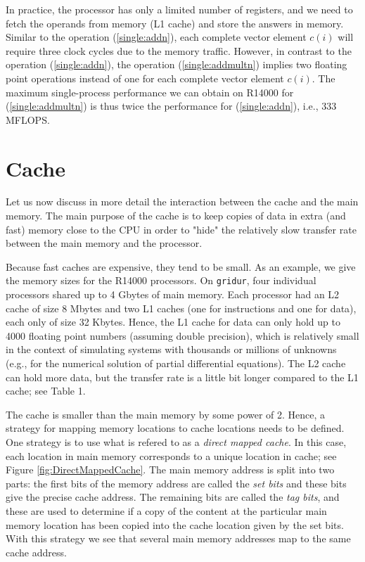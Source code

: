 \documentclass[11pt]{article}
\begin{document}
In practice, the processor has only a limited number of registers, 
and we need to fetch the operands from memory (L1 cache) 
and store the answers in memory.  
Similar to the operation (\ref{single:addn}), each complete 
vector element $c(i)$ will require three clock cycles due to the 
memory traffic. However, in contrast to the operation (\ref{single:addn}),
the operation (\ref{single:addmultn}) implies two floating point operations
instead of one for each complete vector element $c(i)$. 
The maximum single-process performance we can obtain 
on R14000 for (\ref{single:addmultn}) is thus 
twice the performance for (\ref{single:addn}), i.e., 333 MFLOPS. 

\section{Cache}

Let us now discuss in more detail the interaction between the 
cache and the main memory. The main purpose of the cache is to 
keep copies of data in extra (and fast) memory close to the CPU in order to "hide"
the relatively slow transfer rate between the main memory and the processor. 

Because fast caches are expensive, they tend to be small. 
As an example, we give the memory sizes for the R14000 processors. 
On \texttt{gridur}, four individual processors shared up to 4 Gbytes of main memory. 
Each processor had an L2 cache of size 8 Mbytes and two L1 caches 
(one for instructions and one for data), each only of size 32 Kbytes. 
Hence, the L1 cache for data can only hold up to 4000 floating point numbers
(assuming double precision), 
which is relatively small in the context of simulating systems with thousands or  
millions of unknowns (e.g., for the numerical solution of partial differential equations). 
The L2 cache can hold more data, but the transfer rate is a little bit longer 
compared to the L1 cache; see Table 1. 

The cache is smaller than the main memory by some power of 2. 
Hence, a strategy for mapping memory locations to cache locations needs to be defined. 
One strategy is to use what is refered to as a {\em direct mapped cache}. 
In this case, each location in main memory corresponds to a unique location in cache; 
see Figure \ref{fig:DirectMappedCache}. The main memory address is split into two parts: the first bits of the memory address are called the {\em set bits} and these bits 
give the precise cache address.  
The remaining bits are called the {\em tag bits}, 
and these are used to determine if a copy of the content 
at the particular main memory location has been copied into the cache location 
given by the set bits. With this strategy we see that several main  
memory addresses map to the same cache address. 
\end{document}
